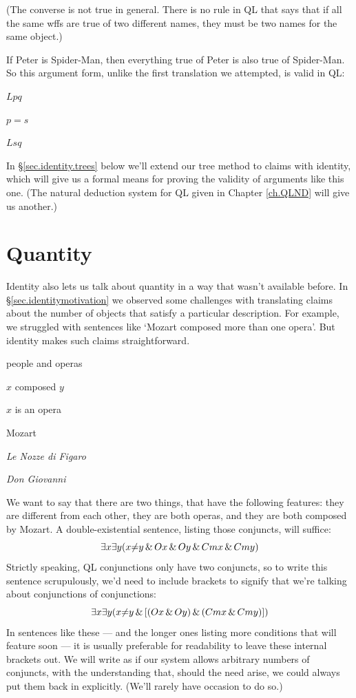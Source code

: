 (The converse is not true in general. There is no rule in QL that says that if all the same wffs are true of two different names, they must be two names for the same object.)

If Peter is Spider-Man, then everything true of Peter is also true of Spider-Man. So this argument form, unlike the first translation we attempted, is valid in QL:

\begin{earg}
\item[] $Lpq$
\item[] $p{=}s$
\item[\therefore] $Lsq$
\end{earg}

In \S\ref{sec.identity.trees} below we'll extend our tree method to claims with identity, which will give us a formal means for proving the validity of arguments like this one. (The natural deduction system for QL given in Chapter \ref{ch.QLND} will give us another.)





\section{Quantity}
\label{sec.quantity}

Identity also lets us talk about quantity in a way that wasn't available before. In \S\ref{sec.identitymotivation} we observed some challenges with translating claims about the number of objects that satisfy a particular description. For example, we struggled with sentences like `Mozart composed more than one opera'. But identity makes such claims straightforward.

\begin{ekey}
\item[UD:] people and operas
\item[Cxy:] $x$ composed $y$
\item[Ox:] $x$ is an opera
\item[m:] Mozart
\item[n:] \emph{Le Nozze di Figaro}
\item[g:] \emph{Don Giovanni}
\end{ekey}

We want to say that there are two things, that have the following features: they are different from each other, they are both operas, and they are both composed by Mozart. A double-existential sentence, listing those conjuncts, will suffice: 
$$\exists x \exists y (x {\neq} y \,\&\, Ox \,\&\, Oy \,\&\, Cmx \,\&\, Cmy)$$
Strictly speaking, QL conjunctions only have two conjuncts, so to write this sentence scrupulously, we'd need to include brackets to signify that we're talking about conjunctions of conjunctions:
$$\exists x \exists y (x {\neq} y \,\&\, [(Ox \,\&\, Oy) \,\&\, (Cmx \,\&\, Cmy)])$$
In sentences like these --- and the longer ones listing more conditions that will feature soon --- it is usually preferable for readability to leave these internal brackets out. We will write as if our system allows arbitrary numbers of conjuncts, with the understanding that, should the need arise, we could always put them back in explicitly. (We'll rarely have occasion to do so.)

